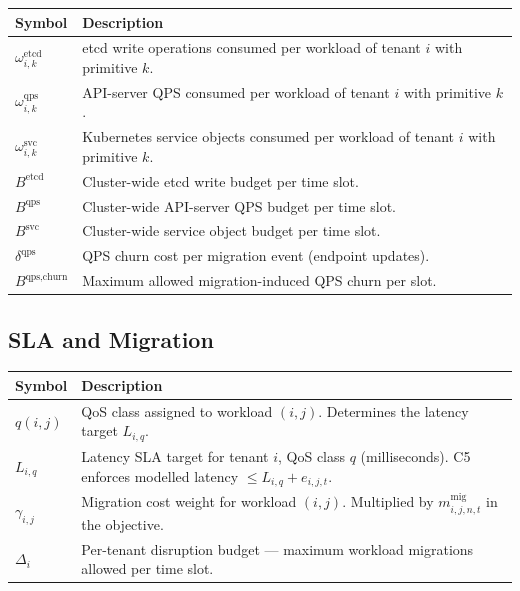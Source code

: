 \documentclass[11pt,a4paper]{article}
\begin{document}
\begin{longtable}{@{}p{3.2cm}p{10.5cm}@{}}
  \toprule
  \textbf{Symbol} & \textbf{Description} \\
  \midrule
  \endhead
  $\omega_{i,k}^{\text{etcd}}$ & etcd write operations consumed per workload of
                                   tenant $i$ with primitive $k$. \\[4pt]
  $\omega_{i,k}^{\text{qps}}$  & API-server QPS consumed per workload of tenant $i$
                                   with primitive $k$. \\[4pt]
  $\omega_{i,k}^{\text{svc}}$  & Kubernetes service objects consumed per workload of
                                   tenant $i$ with primitive $k$. \\[4pt]
  $B^{\text{etcd}}$            & Cluster-wide etcd write budget per time slot. \\[4pt]
  $B^{\text{qps}}$             & Cluster-wide API-server QPS budget per time slot. \\[4pt]
  $B^{\text{svc}}$             & Cluster-wide service object budget per time slot. \\[4pt]
  $\delta^{\text{qps}}$        & QPS churn cost per migration event (endpoint updates). \\[4pt]
  $B^{\text{qps,churn}}$       & Maximum allowed migration-induced QPS churn per slot. \\
  \bottomrule
\end{longtable}

\subsection{SLA and Migration}

\begin{longtable}{@{}p{2.2cm}p{11.5cm}@{}}
  \toprule
  \textbf{Symbol} & \textbf{Description} \\
  \midrule
  \endhead
  $q(i,j)$      & QoS class assigned to workload $(i,j)$.
                   Determines the latency target $L_{i,q}$. \\[4pt]
  $L_{i,q}$     & Latency SLA target for tenant $i$, QoS class $q$ (milliseconds).
                   C5 enforces modelled latency $\le L_{i,q}+e_{i,j,t}$. \\[4pt]
  $\gamma_{i,j}$& Migration cost weight for workload $(i,j)$.  Multiplied by
                   $m_{i,j,n,t}^{\text{mig}}$ in the objective. \\[4pt]
  $\Delta_i$    & Per-tenant disruption budget --- maximum workload migrations
                   allowed per time slot. \\
  \bottomrule
\end{longtable}
\end{document}
